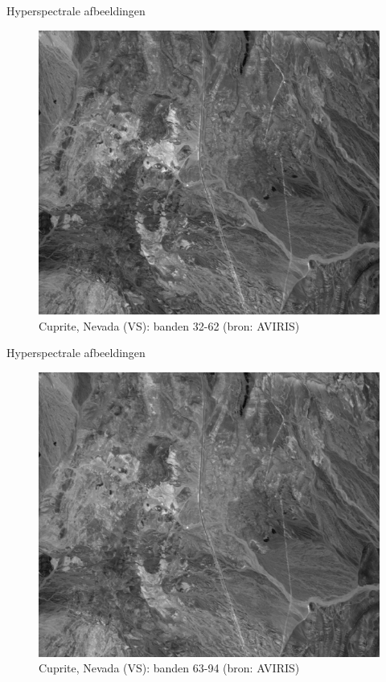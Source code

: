 \documentclass[t,12pt,dutch
\ifx\beamermode\undefined\else,\beamermode\fi
]{beamer}
\begin{document}
\begin{frame}{Hyperspectrale afbeeldingen}

\begin{figure}[H]
\centering
\includegraphics[scale=0.3]{images/cuprite_bands_32-63.png}
\caption{Cuprite, Nevada (VS): banden 32-62 (bron: AVIRIS)}
\end{figure}

\end{frame}

\begin{frame}{Hyperspectrale afbeeldingen}

\begin{figure}[H]
\centering
\includegraphics[scale=0.3]{images/cuprite_bands_63-95.png}
\caption{Cuprite, Nevada (VS): banden 63-94 (bron: AVIRIS)}
\end{figure}

\end{frame}
\end{document}
